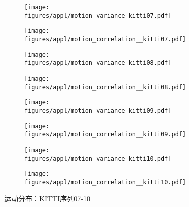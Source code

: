     \begin{figure}[h]
        \centering
        \begin{subfigure}[b]{0.48\textwidth}
            \texttt{[image: figures/appl/motion\_variance\_kitti07.pdf]}
        \end{subfigure}
        \begin{subfigure}[b]{0.48\textwidth}
            \texttt{[image: figures/appl/motion\_correlation\_\_kitti07.pdf]}
        \end{subfigure}
        \begin{subfigure}[b]{0.48\textwidth}
            \texttt{[image: figures/appl/motion\_variance\_kitti08.pdf]}
        \end{subfigure}
        \begin{subfigure}[b]{0.48\textwidth}
            \texttt{[image: figures/appl/motion\_correlation\_\_kitti08.pdf]}
        \end{subfigure}
        \begin{subfigure}[b]{0.48\textwidth}
            \texttt{[image: figures/appl/motion\_variance\_kitti09.pdf]}
        \end{subfigure}
        \begin{subfigure}[b]{0.48\textwidth}
            \texttt{[image: figures/appl/motion\_correlation\_\_kitti09.pdf]}
        \end{subfigure}
        \begin{subfigure}[b]{0.48\textwidth}
            \texttt{[image: figures/appl/motion\_variance\_kitti10.pdf]}
        \end{subfigure}
        \begin{subfigure}[b]{0.48\textwidth}
            \texttt{[image: figures/appl/motion\_correlation\_\_kitti10.pdf]}
        \end{subfigure}
        \caption{运动分布：KITTI序列07-10}
        \label{fig:mp_07_10}
\end{figure}